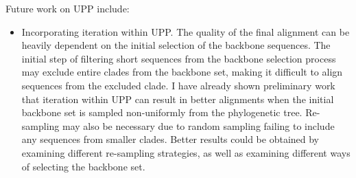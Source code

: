 Future work on UPP include:
\begin{itemize}
\item Incorporating iteration within UPP.  The quality of the final alignment can be heavily dependent on the initial selection of the backbone sequences.  The initial step of filtering short sequences from the backbone selection process may exclude entire clades from the backbone set, making it difficult to align sequences from the excluded clade.  I have already shown preliminary work that iteration within UPP can result in better alignments when the initial backbone set is sampled non-uniformly from the phylogenetic tree.  Re-sampling may also be necessary due to random sampling failing to include any sequences from smaller clades.  Better results could be obtained by examining different re-sampling strategies, as well as examining different ways of selecting the backbone set.  
\end{itemize}




